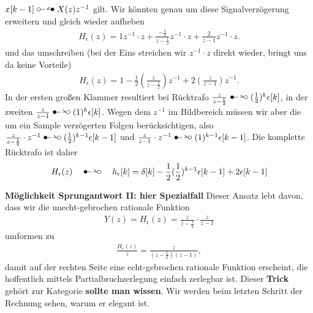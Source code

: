 \begin{ExCalc}
$x[k-1] \ztransf X(z) z^{-1}$ gilt. Wir könnten genau um diese Signalverzögerung erweitern und gleich wieder aufheben
\begin{align}
H_\epsilon(z) = 1 z^{-1} \cdot z + \frac{-\frac{1}{2}}{z-\frac{1}{2}}z^{-1} \cdot z + \frac{2}{z-1}z^{-1} \cdot z.
\end{align}
und das umschreiben (bei der Eins streichen wir $z^{-1} \cdot z$ direkt wieder, bringt uns da keine Vorteile)
\begin{align}
H_\epsilon(z) = 1 -\frac{1}{2} \left(\frac{z}{z-\frac{1}{2}}\right)z^{-1} + 2\left(\frac{z}{z-1}\right)z^{-1}.
\end{align}
In der ersten großen Klammer resultiert bei Rücktrafo $\frac{z}{z-\frac{1}{2}} \Ztransf (\frac{1}{2})^k \epsilon[k]$, in der zweiten
$\frac{z}{z-1} \Ztransf (1)^k \epsilon[k]$. Wegen dem $z^{-1}$ im Bildbereich müssen wir aber die um ein Sample verzögerten Folgen berücksichtigen, also
$\frac{z}{z-\frac{1}{2}} \cdot z^{-1} \Ztransf (\frac{1}{2})^{k-1} \epsilon[k-1]$ und $\frac{z}{z-1} \cdot z^{-1} \Ztransf (1)^{k-1} \epsilon[k-1]$.
Die komplette Rücktrafo ist daher
\begin{align}
H_\epsilon(z) \quad \Ztransf \quad h_\epsilon[k] = \delta[k] - \frac{1}{2} (\frac{1}{2})^{k-1} \epsilon[k-1] + 2 \epsilon[k-1]
\end{align}

\textbf{Möglichkeit Sprungantwort II: hier Spezialfall}
Dieser Ansatz lebt davon, dass wir die unecht-gebrochen rationale Funktion
\begin{align}
Y(z) = H_\epsilon(z) = \frac{z}{z-\frac{1}{2}} \cdot \frac{z}{z-1}
\end{align}
umformen zu
\begin{align}
\frac{H_\epsilon(z)}{z} = \frac{z}{(z-\frac{1}{2})(z-1)},
\end{align}
damit auf der rechten Seite eine echt-gebrochen rationale Funktion erscheint, die
hoffentlich mittels Partialbruchzerlegung einfach zerlegbar ist.
Dieser \textbf{Trick} gehört zur Kategorie \textbf{sollte man wissen}.
Wir werden beim letzten Schritt der Rechnung sehen, warum er elegant ist.


\end{ExCalc}
